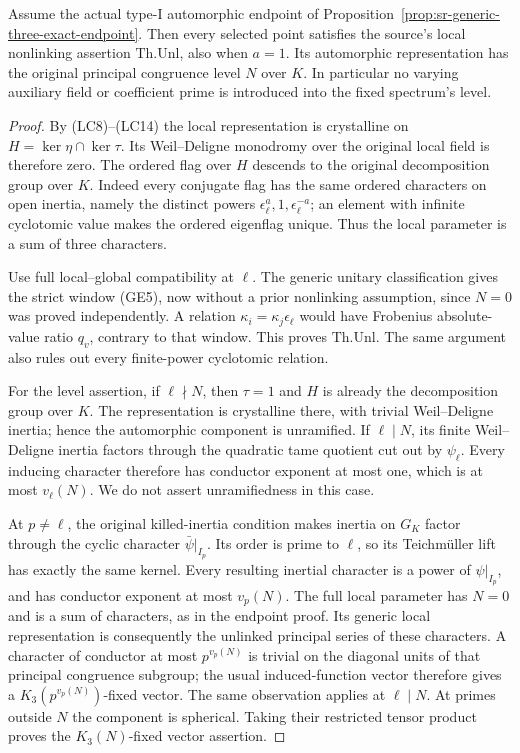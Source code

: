 \begin{srcorollary}\label{cor:sr-generic-original-level}
Assume the actual type-I automorphic endpoint of
Proposition~\ref{prop:sr-generic-three-exact-endpoint}.
Then every selected point satisfies the source's local
nonlinking assertion \(\mathrm{Th.Unl}\), also when \(a=1\).
Its automorphic representation has the original principal
congruence level \(N\) over \(K\).
In particular no varying auxiliary field or coefficient
prime is introduced into the fixed spectrum's level.
\end{srcorollary}
\begin{proof}
By (LC8)--(LC14) the local representation is crystalline
on \(H=\ker\eta\cap\ker\tau\).
Its Weil--Deligne monodromy over the original local field
is therefore zero.
The ordered flag over \(H\) descends to the original
decomposition group over \(K\).
Indeed every conjugate flag has the same ordered characters
on open inertia, namely the distinct powers
\(\epsilon_\ell^a,1,\epsilon_\ell^{-a}\);
an element with infinite cyclotomic value makes the ordered
eigenflag unique.
Thus the local parameter is a sum of three characters.

Use full local--global compatibility at \(\ell\).
The generic unitary classification gives the strict window
(GE5), now without a prior nonlinking assumption, since
\(N=0\) was proved independently.
A relation
\(\kappa_i=\kappa_j\epsilon_\ell\)
would have Frobenius absolute-value ratio \(q_v\),
contrary to that window.
This proves \(\mathrm{Th.Unl}\).
The same argument also rules out every finite-power
cyclotomic relation.

For the level assertion, if \(\ell\nmid N\), then
\(\tau=1\) and \(H\) is already the decomposition group
over \(K\).
The representation is crystalline there, with trivial
Weil--Deligne inertia; hence the automorphic component
is unramified.
If \(\ell\mid N\), its finite Weil--Deligne inertia
factors through the quadratic tame quotient cut out
by \(\psi_\ell\).
Every inducing character therefore has conductor
exponent at most one, which is at most \(v_\ell(N)\).
We do not assert unramifiedness in this case.

At \(p\ne\ell\), the original killed-inertia condition
makes inertia on \(G_K\) factor through the cyclic
character \(\bar\psi|_{I_p}\).
Its order is prime to \(\ell\), so its Teichm\"uller
lift has exactly the same kernel.
Every resulting inertial character is a power of
\(\psi|_{I_p}\), and has conductor exponent at most
\(v_p(N)\).
The full local parameter has \(N=0\) and is a sum of
characters, as in the endpoint proof.
Its generic local representation is consequently
the unlinked principal series of these characters.
A character of conductor at most \(p^{v_p(N)}\)
is trivial on the diagonal units of that principal
congruence subgroup; the usual induced-function vector
therefore gives a \(K_3(p^{v_p(N)})\)-fixed vector.
The same observation applies at \(\ell\mid N\).
At primes outside \(N\) the component is spherical.
Taking their restricted tensor product proves the
\(K_3(N)\)-fixed vector assertion.


\end{proof}
